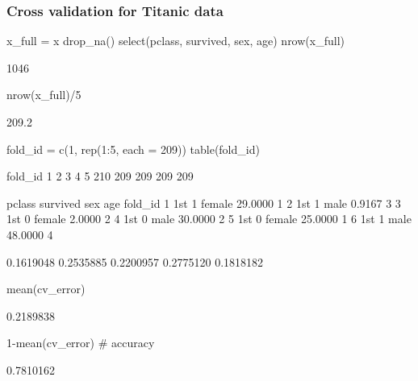 \documentclass[a4paper]{article}\usepackage[]{graphicx}\usepackage[]{xcolor}
\begin{document}
\subsubsection{Cross validation for Titanic data}
\begin{Schunk}
\begin{Sinput}
x_full = x %
  drop_na() %
  select(pclass, survived, 
         sex, age)
nrow(x_full)
\end{Sinput}
\begin{Soutput}
[1] 1046
\end{Soutput}
\begin{Sinput}
nrow(x_full)/5
\end{Sinput}
\begin{Soutput}
[1] 209.2
\end{Soutput}
\begin{Sinput}
fold_id = c(1, rep(1:5, each = 209))
table(fold_id)
\end{Sinput}
\begin{Soutput}
fold_id
  1   2   3   4   5 
210 209 209 209 209 
\end{Soutput}
\begin{Soutput}
  pclass survived    sex     age fold_id
1    1st        1 female 29.0000       1
2    1st        1   male  0.9167       3
3    1st        0 female  2.0000       2
4    1st        0   male 30.0000       2
5    1st        0 female 25.0000       1
6    1st        1   male 48.0000       4
\end{Soutput}
\begin{Soutput}
[1] 0.1619048 0.2535885 0.2200957 0.2775120 0.1818182
\end{Soutput}
\begin{Sinput}
mean(cv_error)
\end{Sinput}
\begin{Soutput}
[1] 0.2189838
\end{Soutput}
\begin{Sinput}
1-mean(cv_error) # accuracy
\end{Sinput}
\begin{Soutput}
[1] 0.7810162
\end{Soutput}
\end{Schunk}
\end{document}
